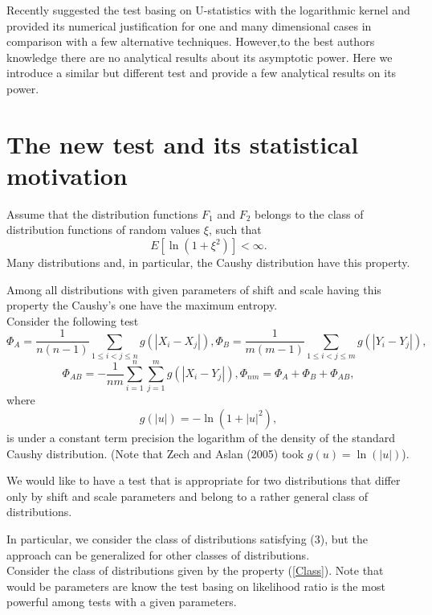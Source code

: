 \documentclass{svproc}
\begin{document}
Recently \cite{AslanZech2005} suggested the test basing on U-statistics with the
logarithmic kernel and provided its numerical justification for one and many dimensional cases in comparison with a few alternative techniques.  However,to the best authors knowledge there are no analytical results about its asymptotic power. Here we introduce a similar but different test and provide a few analytical results on its power.



\section{The new test and its statistical motivation}

Assume that the distribution functions
$F_1$ and $F_2$ belongs to the class of distribution functions of random values  $\xi$, such that
\begin {equation}\label{Class}
E [\ln (1+ \xi^2)     ] < \infty.
\end{equation}
Many distributions and, in particular, the Caushy distribution have this property.
 \bigskip

Among all distributions with given parameters of shift and scale having this property the Caushy's one have the maximum entropy.\\


Consider the following test
\begin{equation}
 \Phi_{A}=\frac{1}{n(n-1)}\sum_{1\leq i<j\leq n} g(|X_i-X_j|),
\Phi_{B}=\frac{1}{m(m-1)}\sum_{1\leq i<j\leq m} g(|Y_i-Y_j|),
\end{equation}
\begin{equation}\label{K1}
\Phi_{AB}=-\frac{1}{nm}\sum_{i=1}^n\sum_{j=1}^m g(|X_i-Y_j|),
\Phi_{nm}=\Phi_{A}+ \Phi_{B}+ \Phi_{AB},
\end{equation}
where
$$
g(|u|)= -\ln (1+|u|^2),
$$
is under a constant term precision the logarithm of the density of the standard Caushy distribution.
(Note that Zech and Aslan (2005) took $g(u)=\ln(|u|)$).



We would like to have a test that is appropriate for two distributions that differ only by shift and scale parameters and belong to a rather general class of distributions.


In particular, we consider the class of distributions satisfying (3), but the approach can be generalized for other classes of distributions.\\
\bigskip
Consider the class of distributions given by the property (\ref{Class}).  Note that would be parameters are know the test basing on likelihood ratio is the most powerful among tests with a given parameters.
\end{document}
